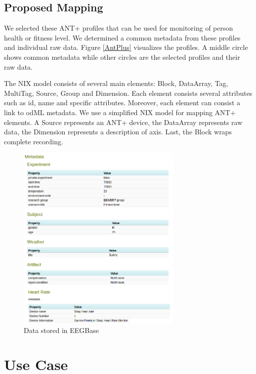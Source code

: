 \documentclass[conference]{IEEEtran}
\begin{document}
\subsection{Proposed Mapping}

We selected these ANT+ profiles that can be used for monitoring of person health or fitness level. We determined a common metadata from these profiles and individual raw data. Figure \ref{AntPlus} visualizes the profiles. A middle circle shows common metadata while other circles are the selected profiles and their raw data. 

The NIX model consists of several main elements: Block, DataArray, Tag, MultiTag, Source, Group and Dimension. Each element consists several attributes such as id, name and specific attributes. Moreover, each element can consist a link to odML metadata. We use a simplified NIX model for mapping ANT+ elements. A Source represents an ANT+ device, the DataArray represents raw data, the Dimension represents a description of axis. Last, the Block wraps complete recording.

\begin{figure}
  \centering\includegraphics[width=8cm]{portal_example.png}
  \caption{Data stored in EEGBase}
  \label{fig:EEGBase}
 \end{figure}


\section{Use Case}\label{sec:use-case}
\end{document}

